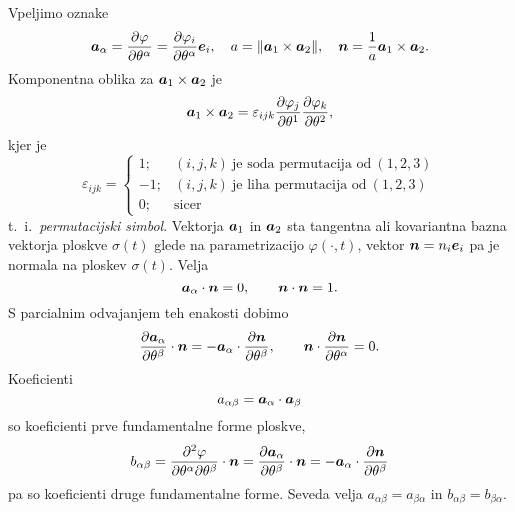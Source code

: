 Vpeljimo oznake
\[
	\boldsymbol a_{\alpha}=\frac{\partial\varphi}{\partial\theta^{\alpha}}
	=\frac{\partial\varphi_i}{\partial\theta^{\alpha}}\boldsymbol e_i
	,\quad a=\|\boldsymbol a_1\times\boldsymbol a_2\|,\quad
	\boldsymbol n=\frac{1}{a}\boldsymbol a_1\times\boldsymbol a_2.
\]
Komponentna oblika za $\boldsymbol a_1\times\boldsymbol a_2$ je
\[
	\boldsymbol a_1\times\boldsymbol a_2=\varepsilon_{ijk}\frac{\partial\varphi_j}{\partial\theta^1}
	\frac{\partial\varphi_k}{\partial\theta^2},
\]
kjer je
\[
	\varepsilon_{ijk}=\left\{\begin{array}{rl}
		1;&(i,j,k)\ \textrm{je soda permutacija od}\ (1,2,3) \\
		-1;&(i,j,k)\ \textrm{je liha permutacija od}\ (1,2,3) \\
		0;&\textrm{sicer}
	\end{array}\right.
\]
t.~i.~\emph{permutacijski simbol}.
Vektorja $\boldsymbol a_1$ in $\boldsymbol a_2$ sta tangentna ali kovariantna bazna vektorja ploskve $\sigma(t)$
glede na parametrizacijo $\varphi(\cdot,t)$,
vektor $\boldsymbol n=n_i\boldsymbol e_i$ pa je normala na ploskev $\sigma(t)$. Velja
\[ \boldsymbol a_{\alpha}\cdot\boldsymbol n=0,\qquad \boldsymbol n\cdot\boldsymbol n=1.  \]
S parcialnim odvajanjem teh enakosti dobimo
\[
	\frac{\partial\boldsymbol a_{\alpha}}{\partial\theta^{\beta}}\cdot\boldsymbol n=
	-\boldsymbol a_{\alpha}\cdot\frac{\partial\boldsymbol n}{\partial\theta^{\beta}},\qquad
	\boldsymbol n\cdot\frac{\partial\boldsymbol n}{\partial\theta^{\alpha}}=0.
\]
Koeficienti
\[
	a_{\alpha\beta}=\boldsymbol a_{\alpha}\cdot\boldsymbol a_{\beta}
\]
so koeficienti prve fundamentalne forme ploskve,
\[
	b_{\alpha\beta}=\frac{\partial^2\varphi}{\partial\theta^{\alpha}\partial\theta^{\beta}}
	\cdot\boldsymbol n=\frac{\partial\boldsymbol a_{\alpha}}{\partial\theta^{\beta}}\cdot\boldsymbol n
	=-\boldsymbol a_{\alpha}\cdot\frac{\partial\boldsymbol n}{\partial\theta^{\beta}}
\]
pa so koeficienti druge fundamentalne forme. Seveda velja $a_{\alpha\beta}=a_{\beta\alpha}$
in $b_{\alpha\beta}=b_{\beta\alpha}$.

